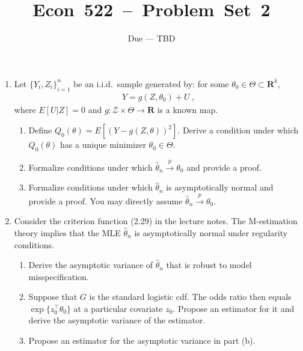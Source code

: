 \documentclass[11 pt, a4paper]{article}
\begin{document}
\title{\vspace*{-2cm}\sc \mbox{\Large Econ 522 -- Problem Set 2}}
\date{\vspace*{-1.5cm}Due --- TBD}
\maketitle
\vspace*{-1cm}


\begin{enumerate}
  \item Let $\{Y_i,Z_i\}_{i=1}^n$ be an i.i.d.\ sample generated by: for some $\theta_0\in\Theta\subset\mathbf R^k$,
  \begin{align}
  Y = g(Z,\theta_0)+ U~,
  \end{align}
  where $E[U|Z]=0$ and $g: \mathcal Z\times\Theta\to\mathbf R$ is a known map.
  \begin{enumerate}
    \item Define $Q_0(\theta)=E[(Y-g(Z,\theta))^2]$. Derive a condition under which $Q_0(\theta)$ has a unique minimizer $\theta_0\in\Theta$.
    \item Formalize conditions under which $\hat\theta_n\overset{p}{\to}\theta_0$ and provide a proof.
    \item Formalize conditions under which $\hat\theta_n$ is asymptotically normal and provide a proof. You may directly assume $\hat\theta_n\overset{p}{\to}\theta_0$.
  \end{enumerate}

  \item Consider the criterion function (2.29) in the lecture notes. The M-estimation theory implies that the MLE $\hat\theta_n$ is asymptotically normal under regularity conditions.
  \begin{enumerate}
    \item Derive the asymptotic variance of $\hat\theta_n$ that is robust to model misspecification.
    \item Suppose that $G$ is the standard logistic cdf. The odds ratio then equals $\exp\{z_0^\intercal\theta_0\}$ at a particular covariate $z_0$. Propose an estimator for it and derive the asymptotic variance of the estimator.
    \item Propose an estimator for the asymptotic variance in part (b).
  \end{enumerate}


\end{enumerate}
\end{document}
